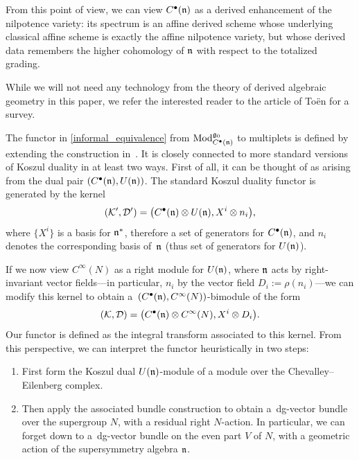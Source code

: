 \documentclass[pdftex]{sigma}
\numberwithin{equation}{section}
\begin{document}
From this point of view, we can view $C^\bullet(\mathfrak n)$ as a derived enhancement of the nilpotence variety: its spectrum is an affine derived scheme whose underlying classical affine scheme is exactly the affine nilpotence variety, but whose derived data remembers the higher cohomology of $\mathfrak n$ with respect to the totalized grading.

\begin{rmk}
	While we will not need any technology from the theory of derived algebraic geometry in this paper, we refer the interested reader to the article \cite{ToenDAG} of To\"en for a survey.
\end{rmk}

The functor in \eqref{informal_equivalence} from $\mathrm{Mod}_{C^\bullet(\mathfrak n)}^{\mathfrak g_0}$ to multiplets is defined by extending the construction in~\cite{perspectives}. It is closely connected to more standard versions of Koszul duality in at least two ways.
First of all, it can be thought of as arising from the dual pair $(C^\bullet(\mathfrak n), U(\mathfrak n))$. The standard Koszul duality functor is generated by the kernel
\begin{equation*}
(\mathcal K', \mathcal D') = \big(C^\bullet(\mathfrak n) \otimes U(\mathfrak n) , X^i \otimes n_i\big),
\end{equation*}
where $\big\{X^i\big\}$ is a basis for $\mathfrak n^*$, therefore a set of generators for $C^\bullet(\mathfrak n)$, and $n_i$ denotes the corresponding
basis of~$\mathfrak n$ (thus set of generators for $U(\mathfrak n)$).

If we now view $C^\infty(N)$ as a right module for $U(\mathfrak n)$, where $\mathfrak n$ acts by right-invariant vector fields---in particular, $n_i$ by the vector field $D_i := \rho(n_i)$---we can modify this kernel to obtain a~$(C^\bullet(\mathfrak n), C^\infty(N))$-bimodule of the form
\begin{equation*}
(\mathcal K, \mathcal D) = \big(C^\bullet(\mathfrak n) \otimes C^\infty(N) , X^i \otimes D_i\big).
\end{equation*}
Our functor is defined as the integral transform associated to this kernel. From this perspective, we can interpret the functor heuristically in two steps:
\begin{enumerate}\itemsep=0pt
	\item First form the Koszul dual $U(\mathfrak n)$-module of a module over the Chevalley--Eilenberg complex.
	\item Then apply the associated bundle construction to obtain a~dg-vector bundle over the supergroup $N$, with a residual right $N$-action. In particular, we can forget down to a~dg-vector bundle on the even part $V$ of $N$, with a geometric action of the supersymmetry algebra $\mathfrak n$.
\end{enumerate}
\end{document}
